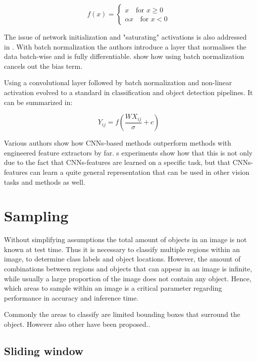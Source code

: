 	$$
		f(x) = \begin{cases}
			x \quad \text{for } x \geq 0 \\
			\alpha x \quad \text{for } x < 0
		\end{cases}
	$$
	
	The issue of network initialization and "saturating" activations is also addressed in \cite{Ioffe2015}. With batch normalization the authors introduce a layer that normalises the data batch-wise and is fully differentiable.  show how using batch normalization cancels out the bias term.
		
	Using a convolutional layer followed by batch normalization and non-linear activation evolved to a standard in classification and object detection pipelines. It can be summarized in:
	
	$$
	Y_{ij} = f(\frac{WX_{ij}}{\sigma}+c)
	$$
	

	Various authors show how \acp{CNN}-based methods outperform methods with engineered feature extractors by far. \cite{Razavian}s experiments show how that this is not only due to the fact that \acp{CNN}-features are learned on a specific task, but that \acp{CNN}-features can learn a quite general representation that can be used in other vision tasks and methods as well.
	

	\section{Sampling}
	
	Without simplifying assumptions the total amount of objects in an image is not known at test time. Thus it is necessary to classify multiple regions within an image, to determine class labels and object locations. However, the amount of combinations between regions and objects that can appear in an image is infinite, while usually a large proportion of the image does not contain any object. Hence, which areas to sample within an image is a critical parameter regarding performance in accuracy and inference time.
	
	Commonly the areas to classify are limited bounding boxes that surround the object. However also other have been proposed..	
	
	
	
	\subsection{Sliding window}
	

